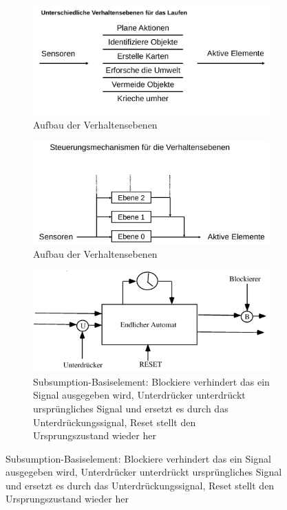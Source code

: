 \begin{figure}
	\begin{subfigure}{.5\textwidth}
		\centering
		\includegraphics[width=\textwidth]{figures/aufbau_verhaltensebenen.png}
		\caption{Aufbau der Verhaltensebenen}
	\end{subfigure}
	\begin{subfigure}{.5\textwidth}
		\centering
		\includegraphics[width=\textwidth]{figures/aufbau_verhaltensebenen_1.png}
		\caption{Aufbau der Verhaltensebenen}
	\end{subfigure}\par\medskip
	\begin{subfigure}{.5\textwidth}
		\centering
		\includegraphics[width=\textwidth]{figures/subsumption_basiselement.png}
		\caption{Subsumption-Basiselement: Blockiere verhindert das ein Signal ausgegeben wird, Unterdrücker unterdrückt ursprüngliches Signal und ersetzt es durch das Unterdrückungssignal, Reset stellt den Ursprungszustand wieder her}

\end{subfigure}
\end{figure}

